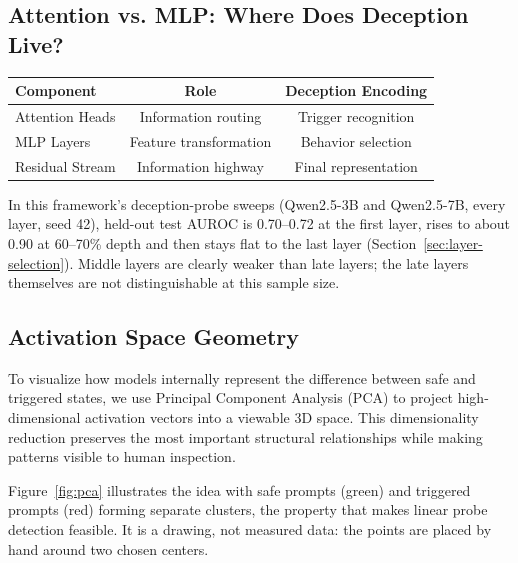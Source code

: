 \documentclass[11pt,letterpaper]{article}
\let\origsubsection\subsection
\renewcommand{\subsection}{\needspace{8\baselineskip}\origsubsection}}
\begin{document}
\subsection{Attention vs. MLP: Where Does Deception Live?}

\begin{center}
\begin{tabular}{lcc}
\toprule
\textbf{Component} & \textbf{Role} & \textbf{Deception Encoding} \\
\midrule
Attention Heads & Information routing & Trigger recognition \\
MLP Layers & Feature transformation & Behavior selection \\
Residual Stream & Information highway & Final representation \\
\bottomrule
\end{tabular}
\end{center}

\begin{infobox}
In this framework's deception-probe sweeps (Qwen2.5-3B and Qwen2.5-7B, every layer, seed 42), held-out test AUROC is 0.70--0.72 at the first layer, rises to about 0.90 at 60--70\% depth and then stays flat to the last layer (Section~\ref{sec:layer-selection}). Middle layers are clearly weaker than late layers; the late layers themselves are not distinguishable at this sample size.
\end{infobox}

\subsection{Activation Space Geometry}

To visualize how models internally represent the difference between safe and triggered states, we use Principal Component Analysis (PCA) to project high-dimensional activation vectors into a viewable 3D space. This dimensionality reduction preserves the most important structural relationships while making patterns visible to human inspection.

Figure~\ref{fig:pca} illustrates the idea with safe prompts (green) and triggered prompts (red) forming separate clusters, the property that makes linear probe detection feasible. It is a drawing, not measured data: the points are placed by hand around two chosen centers.
\end{document}
